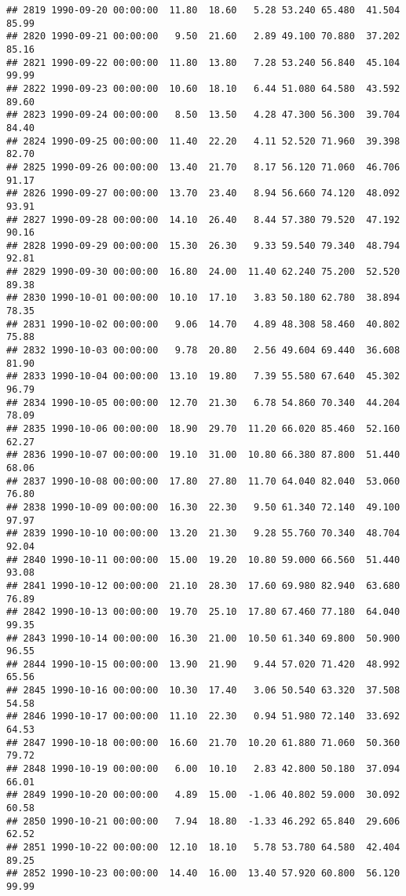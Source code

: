 \documentclass{article}\usepackage{graphicx, color}
\makeatletter
\newenvironment{kframe}{%
 \def\at@end@of@kframe{}%
 \ifinner\ifhmode%
  \def\at@end@of@kframe{\end{minipage}}%
  \begin{minipage}{\columnwidth}%
 \fi\fi%
 \def\FrameCommand##1{\hskip\@totalleftmargin \hskip-\fboxsep
 \colorbox{shadecolor}{##1}\hskip-\fboxsep
     \hskip-\linewidth \hskip-\@totalleftmargin \hskip\columnwidth}%
 \MakeFramed {\advance\hsize-\width
   \@totalleftmargin\z@ \linewidth\hsize
   \@setminipage}}%
 {\par\unskip\endMakeFramed%
 \at@end@of@kframe}
\newenvironment{knitrout}{}{} %
\makeatother
\begin{document}
\begin{knitrout}
\begin{kframe}
\begin{verbatim}
## 2819 1990-09-20 00:00:00  11.80  18.60   5.28 53.240 65.480  41.504  85.99
## 2820 1990-09-21 00:00:00   9.50  21.60   2.89 49.100 70.880  37.202  85.16
## 2821 1990-09-22 00:00:00  11.80  13.80   7.28 53.240 56.840  45.104  99.99
## 2822 1990-09-23 00:00:00  10.60  18.10   6.44 51.080 64.580  43.592  89.60
## 2823 1990-09-24 00:00:00   8.50  13.50   4.28 47.300 56.300  39.704  84.40
## 2824 1990-09-25 00:00:00  11.40  22.20   4.11 52.520 71.960  39.398  82.70
## 2825 1990-09-26 00:00:00  13.40  21.70   8.17 56.120 71.060  46.706  91.17
## 2826 1990-09-27 00:00:00  13.70  23.40   8.94 56.660 74.120  48.092  93.91
## 2827 1990-09-28 00:00:00  14.10  26.40   8.44 57.380 79.520  47.192  90.16
## 2828 1990-09-29 00:00:00  15.30  26.30   9.33 59.540 79.340  48.794  92.81
## 2829 1990-09-30 00:00:00  16.80  24.00  11.40 62.240 75.200  52.520  89.38
## 2830 1990-10-01 00:00:00  10.10  17.10   3.83 50.180 62.780  38.894  78.35
## 2831 1990-10-02 00:00:00   9.06  14.70   4.89 48.308 58.460  40.802  75.88
## 2832 1990-10-03 00:00:00   9.78  20.80   2.56 49.604 69.440  36.608  81.90
## 2833 1990-10-04 00:00:00  13.10  19.80   7.39 55.580 67.640  45.302  96.79
## 2834 1990-10-05 00:00:00  12.70  21.30   6.78 54.860 70.340  44.204  78.09
## 2835 1990-10-06 00:00:00  18.90  29.70  11.20 66.020 85.460  52.160  62.27
## 2836 1990-10-07 00:00:00  19.10  31.00  10.80 66.380 87.800  51.440  68.06
## 2837 1990-10-08 00:00:00  17.80  27.80  11.70 64.040 82.040  53.060  76.80
## 2838 1990-10-09 00:00:00  16.30  22.30   9.50 61.340 72.140  49.100  97.97
## 2839 1990-10-10 00:00:00  13.20  21.30   9.28 55.760 70.340  48.704  92.04
## 2840 1990-10-11 00:00:00  15.00  19.20  10.80 59.000 66.560  51.440  93.08
## 2841 1990-10-12 00:00:00  21.10  28.30  17.60 69.980 82.940  63.680  76.89
## 2842 1990-10-13 00:00:00  19.70  25.10  17.80 67.460 77.180  64.040  99.35
## 2843 1990-10-14 00:00:00  16.30  21.00  10.50 61.340 69.800  50.900  96.55
## 2844 1990-10-15 00:00:00  13.90  21.90   9.44 57.020 71.420  48.992  65.56
## 2845 1990-10-16 00:00:00  10.30  17.40   3.06 50.540 63.320  37.508  54.58
## 2846 1990-10-17 00:00:00  11.10  22.30   0.94 51.980 72.140  33.692  64.53
## 2847 1990-10-18 00:00:00  16.60  21.70  10.20 61.880 71.060  50.360  79.72
## 2848 1990-10-19 00:00:00   6.00  10.10   2.83 42.800 50.180  37.094  66.01
## 2849 1990-10-20 00:00:00   4.89  15.00  -1.06 40.802 59.000  30.092  60.58
## 2850 1990-10-21 00:00:00   7.94  18.80  -1.33 46.292 65.840  29.606  62.52
## 2851 1990-10-22 00:00:00  12.10  18.10   5.78 53.780 64.580  42.404  89.25
## 2852 1990-10-23 00:00:00  14.40  16.00  13.40 57.920 60.800  56.120  99.99

\end{verbatim}
\end{kframe}
\end{knitrout}
\end{document}
